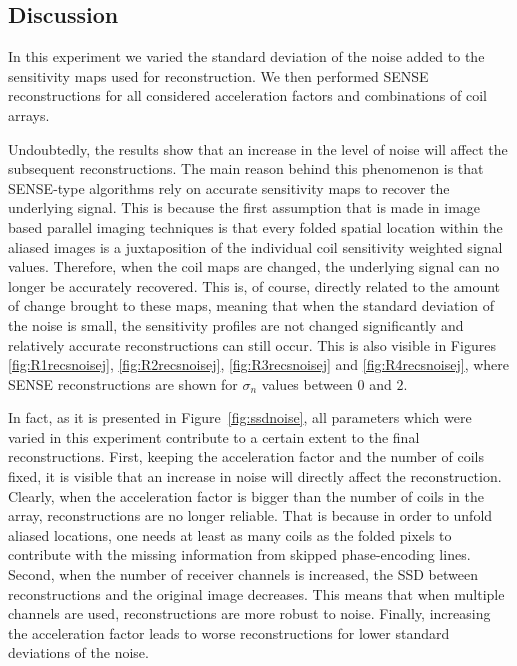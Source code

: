 \subsection{Discussion}
In this experiment we varied the standard deviation of the noise added to the sensitivity maps used for reconstruction. We then performed SENSE reconstructions for all considered acceleration factors and combinations of coil arrays.

Undoubtedly, the results show that an increase in the level of noise will affect the subsequent reconstructions. The main reason behind this phenomenon is that SENSE-type algorithms rely on accurate sensitivity maps to recover the underlying signal. This is because the first assumption that is made in image based parallel imaging techniques is that every folded spatial location within the aliased images is a juxtaposition of the individual coil sensitivity weighted signal values. Therefore, when the coil maps are changed, the underlying signal can no longer be accurately recovered. This is, of course, directly related to the amount of change brought to these maps, meaning that when the standard deviation of the noise is small, the sensitivity profiles are not changed significantly and relatively accurate reconstructions can still occur. This is also visible in Figures \ref{fig:R1recsnoisej}, \ref{fig:R2recsnoisej}, \ref{fig:R3recsnoisej} and \ref{fig:R4recsnoisej}, where SENSE reconstructions are shown for $\sigma_n$ values between $0$ and $2$.

In fact, as it is presented in Figure~\ref{fig:ssdnoise}, all parameters which were varied in this experiment contribute to a certain extent to the final reconstructions. First, keeping the acceleration factor and the number of coils fixed, it is visible that an increase in noise will directly affect the reconstruction. Clearly, when the acceleration factor is bigger than the number of coils in the array, reconstructions are no longer reliable. That is because in order to unfold aliased locations, one needs at least as many coils as the folded pixels to contribute with the missing information from skipped phase-encoding lines. Second, when the number of receiver channels is increased, the SSD between reconstructions and the original image decreases. This means that when multiple channels are used, reconstructions are more robust to noise. Finally, increasing the acceleration factor leads to worse reconstructions for lower standard deviations of the noise. 

